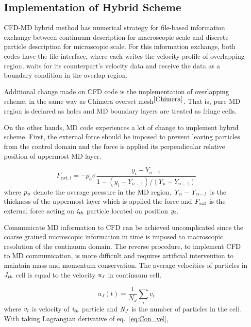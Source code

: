 \documentclass{CFD2010paper}
\begin{document}
\subsection{Implementation of Hybrid Scheme}
CFD-MD hybrid method has numerical strategy for file-based information exchange between continuum description for macroscopic scale and discrete particle description for microscopic scale. For this information exchange, both codes have the file interface, where each writes the velocity profile of overlapping region, waits for its counterpart's velocity data and receive the data as a boundary condition in the overlap region.

Additional change made on CFD code is the implementation of overlapping scheme, in the same way as Chimera overset mesh$^{\cite{Chimera}}$. That is, pure MD region is declared as holes and MD boundary layers are treated as fringe cells.

On the other hands, MD code experiences a lot of change to implement hybrid scheme. First, the external force should be imposed to prevent leaving particles from the control domain and the force is applied its perpendicular relative position of uppermost MD layer.

\vspace{-.2em}
\begin{equation}
 F_{ext, i} = -p_{a}\sigma\frac{y_{i}-Y_{n-1}}{1-(y_{i}-Y_{n-1})/(Y_{n}-Y_{n-1})}
 \label{eq:Con_vel}
\end{equation}
\normalsize
where $\it p_{a}$ denote the average pressure in the MD region, $\it Y_{n}-Y_{n-1}$ is the thickness of the uppermost layer which is applied the force and $\it F_{ext}$ is the external force acting on $\it i_{th}$ particle located on position $\it y_{i}$.

Communicate MD information to CFD can be achieved uncomplicated since the coarse grained microscopic information in time is imposed to macroscopic resolution of the continuum domain. The reverse procedure, to implement  CFD to MD communication, is more difficult and requires artificial intervention to maintain mass and momentum conservation. The average velocities of particles in $\it J_{th}$ cell is equal to the velocity $\it u_{J}$ in continuum cell.

\vspace{-.2em}
\begin{equation}
 u_{J}(t) = \frac{1}{N_{J}} \displaystyle\sum_{i} v_{i}
 \label{eq:Con_vel}
\end{equation}
\normalsize
where $\it v_{i}$ is velocity of  $\it i_{th}$ particle and $\it N_{J}$ is the number of particles in the cell.   With taking Lagrangian derivative  of eq.~\ref{eq:Con_vel},
\end{document}

